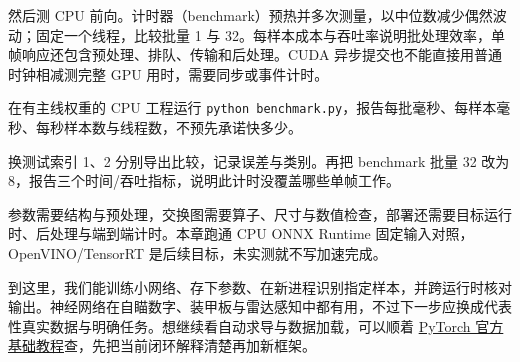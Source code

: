 然后测 CPU 前向。计时器（benchmark）预热并多次测量，以中位数减少偶然波动；固定一个线程，比较批量 1 与 32。每样本成本与吞吐率说明批处理效率，单帧响应还包含预处理、排队、传输和后处理。CUDA 异步提交也不能直接用普通时钟相减测完整 GPU 用时，需要同步或事件计时。
\begin{example}[同一模型比较两个批量]
在有主线权重的 CPU 工程运行 \texttt{python benchmark.py}，报告每批毫秒、每样本毫秒、每秒样本数与线程数，不预先承诺快多少。
\end{example}
\begin{dlblock}

\end{dlblock}
\begin{exercise}\label{ex:v2-dl-deploy}
换测试索引 1、2 分别导出比较，记录误差与类别。再把 benchmark 批量 32 改为 8，报告三个时间/吞吐指标，说明此计时没覆盖哪些单帧工作。
\end{exercise}
\begin{conclusion}
参数需要结构与预处理，交换图需要算子、尺寸与数值检查，部署还需要目标运行时、后处理与端到端计时。本章跑通 CPU ONNX Runtime 固定输入对照，OpenVINO/TensorRT 是后续目标，未实测就不写加速完成。
\end{conclusion}
到这里，我们能训练小网络、存下参数、在新进程识别指定样本，并跨运行时核对输出。神经网络在自瞄数字、装甲板与雷达感知中都有用，不过下一步应换成代表性真实数据与明确任务。想继续看自动求导与数据加载，可以顺着 \href{https://docs.pytorch.org/tutorials/beginner/basics/}{PyTorch 官方基础教程}查，先把当前闭环解释清楚再加新框架。
